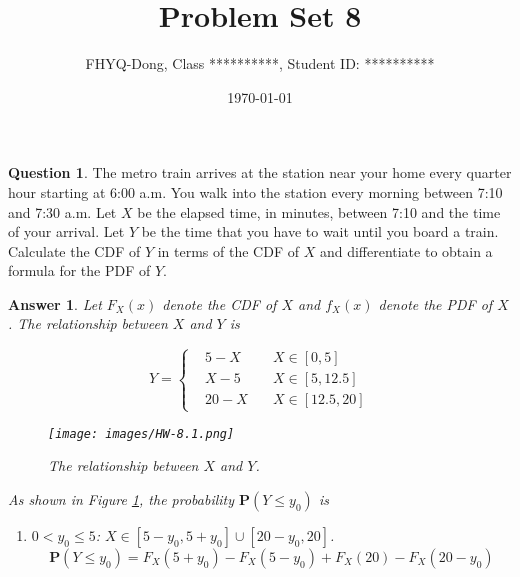 \documentclass[utf8]{article}
\title{Problem Set 8}
\author{ FHYQ-Dong, Class **********, Student ID: ********** }
\date{\today}
\theoremstyle{definition}%
\newtheorem{question}{Question} %
\theoremstyle{plain}%
\newtheorem{answer}{Answer} %
\begin{document}
\maketitle
\thispagestyle{fancy}

\begin{question}
    The metro train arrives at the station near your home every quarter hour starting at 6:00 a.m. You walk into the station every morning between 7:10 and 7:30 a.m. Let $X$ be the elapsed time, in minutes, between 7:10 and the time of your arrival. Let $Y$ be the time that you have to wait until you board a train. Calculate the CDF of $Y$ in terms of the CDF of $X$ and differentiate to obtain a formula for the PDF of $Y$.
\end{question}
\begin{answer}
    Let $F_{X}(x)$ denote the CDF of $X$ and $f_{X}(x)$ denote the PDF of $X$. The relationship between $X$ and $Y$ is 
    \begin{figure}[H]
        \centering
        \begin{minipage}[c]{0.45\textwidth}
            \begin{equation}
                Y = \left\{\begin{aligned}
                    &5 - X \quad &X \in [0, 5] \\
                    &X - 5 \quad &X \in [5, 12.5] \\ 
                    &20 - X \quad &X \in [12.5, 20] 
                \end{aligned}\right.
            \end{equation}
        \end{minipage}
        \hfill
        \begin{minipage}[c]{0.45\textwidth}
            \centering
            \texttt{[image: images/HW-8.1.png]}
            \vspace{-1.5em}
            \caption{\textit{The relationship between $X$ and $Y$.}}
            \label{fig:HW-8.1}
        \end{minipage}
    \end{figure}
    As shown in Figure \ref{fig:HW-8.1}, the probability $\mathbf{P}(Y \leq y_0)$ is
    \begin{enumerate}[label=(\alph*)]
        \item $0 < y_0 \leq 5$: $X \in [5-y_0, 5+y_0] \cup [20-y_0, 20]$.
            \begin{equation}
                \mathbf{P}(Y \leq y_0) = F_{X}(5+y_0) - F_{X}(5-y_0) + F_{X}(20) - F_{X}(20-y_0)

\end{equation}
\end{enumerate}
\end{answer}
\end{document}
